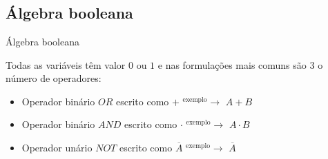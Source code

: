 

\section{\insertlecture}

    \def\xshift{0.75cm} %
    \def\onein{\scriptsize A}
   \def\anotherin{\scriptsize B}
   \def\out{\scriptsize X}

\subsection{Álgebra booleana}
\begin{frame}{Álgebra booleana}

  Todas as variáveis têm valor $0$ ou $1$ e nas formulações mais
  comuns são 3 o número de operadores:
  \begin{itemize}
  \item<2> Operador binário $OR$ escrito como $+$ \hspace{1cm}
    $^\text{exemplo}\rightarrow$ $A+B$
  \item<2> Operador binário $AND$ escrito como $\cdot$  \hspace{1cm}   $^\text{exemplo}\rightarrow$ $A\cdot{}B$
  \item<2> Operador unário $NOT$ escrito como $\overline{A}$ \hspace{1cm}   $^\text{exemplo}\rightarrow$ $\overline{A}$
  \end{itemize}

\end{frame}

